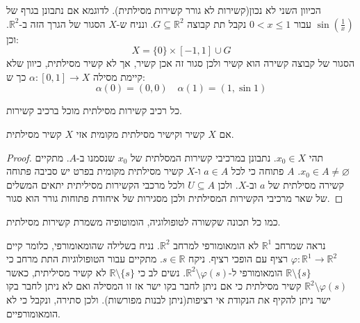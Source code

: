 \documentclass{tstextbook}
\begin{document}
\begin{remark}
הכיוון השני לא נכון(קשירות לא גורר קשירות מסילתית). לדוגמא אם נתבונן בגרף של \(\sin\left( \frac{1}{x} \right)\) עבור \(0<x\leq 1\) נקבל תת קבוצה \(G\subseteq \mathbb{R}^{2}\). ונניח ש-\(X\) הסגור של הגרך הזה ב-\(\mathbb{R}^{2}\). וכן:
$$X=\{ 0 \}\times[-1,1]\cup  G$$
הסגור של קבוצה קשירה הוא קשיר ולכן סגור זה אכן קשיר, אך לא קשיר מסילתית, כיוון שלא קיימת מסילה \(\alpha:[0,1]\to X\) כך ש:
$$\alpha(0)=(0,0)\quad \alpha(1)=(1,\sin 1)$$

\end{remark}
\begin{corollary}
כל רכיב קשירות מסילתית מוכל ברכיב קשירות.

\end{corollary}
\begin{proposition}
אם \(X\) קשיר וקישיר מסילתית מקומית אזי \(X\) קשיר מסילתית.

\end{proposition}
\begin{proof}
תהי \(x_{0} \in X\). נתבונן במרכיבי קשירות המסלתית של \(x_{0}\) שנסמנו ב-\(A\). מתקיים \(x_{0} \in A\neq \varnothing\). \(A\) פתוחה כי לכל \(a \in A\) ו-\(X\) קשיר מסילתית מקומית בפרט יש סביבה פתוחה קשירה מסילתית של \(a\) וב-\(X\).
ולכן \(U\subseteq A\) ולכל מרכבי הקשירות מסיליתית יתאים המשלים של שאר מרכיבי הקשירות המסילתית ולכן מסגירות של איחודת פתוחות גורר הוא סגור.

\end{proof}
\begin{proposition}
כמו כל תכונה שקשורה לטופולוגיה, הומוטופיה משמרת קשירות מסילתית.

\end{proposition}
\begin{example}
נראה שמרחב \(\mathbb{R}^{1}\) לא הומאומורפי למרחב \(\mathbb{R}^{2}\). נניח בשלילה שהומאומורפי, כלומר קיים \(\varphi:\mathbb{R}^{1}\to \mathbb{R}^{2}\) רציף עם הופכי רציף.
ניקח \(s \in \mathbb{R}\). מתקיים עבור הטופולוגיות התת מרחב כי \(\mathbb{R}\setminus \{ s \}\) הומאומורפי ל-\(\mathbb{R}^{2}\setminus \varphi(s)\). נשים לב כי \(\mathbb{R}\setminus \{ s \}\) לא קשיר מסיליתית, כאשר \(\mathbb{R}^{2}\setminus \varphi(s)\) קשיר מסילתית כי אם ניתן לחבר בקו ישר אז זו המסילה ואם לא ניתן לחבר בקו ישר ניתן להקיף את הנקודת אי רציפות(ניתן לבנות מפורשות). ולכן סתירה, ונקבל כי לא הומאומורפיים.

\end{example}
\end{document}
